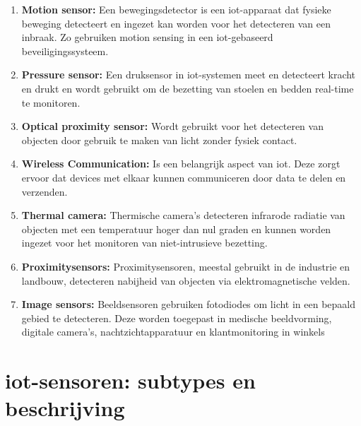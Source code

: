 \begin{enumerate}
    \item \textbf{Motion sensor:} Een bewegingsdetector is een \gls{iot}-apparaat dat fysieke beweging detecteert en ingezet kan worden voor het detecteren van een inbraak. Zo gebruiken \autocite{Tiong2019} motion sensing in een \gls{iot}-gebaseerd beveiligingssysteem.
    
    \item \textbf{Pressure sensor:} Een druksensor in \gls{iot}-systemen meet en detecteert kracht en drukt en wordt gebruikt om de bezetting van stoelen en bedden real-time te monitoren.
    
    \item \textbf{Optical proximity sensor:} Wordt gebruikt voor het detecteren van objecten door gebruik te maken van licht zonder fysiek contact.
    
    \item \textbf{Wireless Communication:} Is een belangrijk aspect van \gls{iot}. Deze zorgt ervoor dat devices met elkaar kunnen communiceren door data te delen en verzenden.
    
    \item \textbf{Thermal camera:} Thermische camera's detecteren infrarode radiatie van objecten met een temperatuur hoger dan nul graden en kunnen worden ingezet voor het monitoren van niet-intrusieve bezetting.
    
    \item \textbf{Proximitysensors:} Proximitysensoren, meestal gebruikt in de industrie en landbouw, detecteren nabijheid van objecten via elektromagnetische velden.
    
    \item \textbf{Image sensors:} Beeldsensoren gebruiken fotodiodes om licht in een bepaald gebied te detecteren. Deze worden toegepast in medische beeldvorming, digitale camera's, nachtzichtapparatuur en klantmonitoring in winkels
\end{enumerate}


\section{\gls{iot}-sensoren: subtypes en beschrijving}\\

